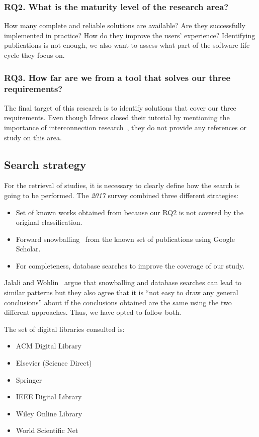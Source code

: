 \subsubsection{RQ2. What is the maturity level of the research area?}
How many complete and reliable solutions are available?
Are they successfully implemented in practice?
How do they improve the users' experience? Identifying publications is not enough,
we also want to assess what part of the software life cycle they focus on.

\subsubsection{RQ3. How far are we from a tool that solves our three requirements?}
The final target of this research is to identify solutions that cover our three
requirements.
Even though Idreos closed their tutorial by
mentioning the importance of interconnection research~\cite{Idreos2015}, they do not provide any references or study on this area.

\subsection{Search strategy}
\label{sec:mapping/search_strategy}

For the retrieval of studies, it is necessary to clearly define
how the search is going to be performed. The \emph{2017} survey combined
three different strategies:

\begin{itemize}
  \item Set of known works obtained from \cite{Idreos2015} because our RQ2 is
    not covered by the original classification.
  \item Forward snowballing~\cite{Webster2002} from the known set of publications using Google Scholar.
  \item For completeness, database searches to improve the coverage of our study.
\end{itemize}

Jalali and Wohlin~\cite{Jalali2012} argue that snowballing and database searches
can lead to similar patterns but they also agree that it is
``not easy to draw any general conclusions'' about if the conclusions obtained are the same
using the two different approaches. Thus, we have opted to follow both.

The set of digital libraries consulted is:

\begin{itemize}
  \item ACM Digital Library
  \item Elsevier (Science Direct)
  \item Springer
  \item IEEE Digital Library
  \item Wiley Online Library
  \item World Scientific Net
\end{itemize}

